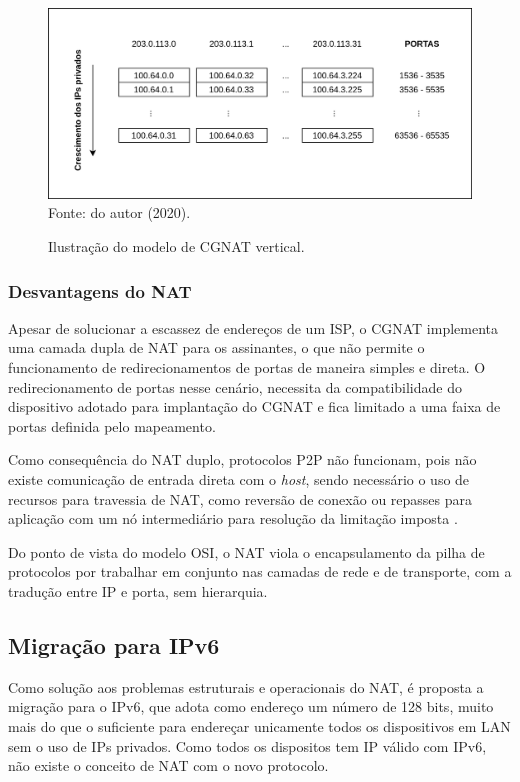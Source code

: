     \begin{figure}[!htb]
        \centering
        \caption{Ilustração do modelo de CGNAT vertical.} 
        \label{fig:cgnat_vertical} 
        \includegraphics[width=0.9\linewidth]{img/CGNAT-Vertical.png} \\
        {\small Fonte: do autor (2020).} 
    \end{figure}

\subsubsection{Desvantagens do NAT}

    Apesar de solucionar a escassez de endereços de um ISP, o CGNAT implementa uma camada dupla de NAT para os assinantes, o que não permite o funcionamento de redirecionamentos de portas de maneira simples e direta. O redirecionamento de portas nesse cenário, necessita da compatibilidade do dispositivo adotado para implantação do CGNAT e fica limitado a uma faixa de portas definida pelo mapeamento.
    
    Como consequência do NAT duplo, protocolos P2P não funcionam, pois não existe comunicação de entrada direta com o \textit{host}, sendo necessário o uso de recursos para travessia de NAT, como reversão de conexão ou repasses para aplicação com um nó intermediário para resolução da limitação imposta \cite{kurose2014}.
    
    Do ponto de vista do modelo OSI, o NAT viola o encapsulamento da pilha de protocolos por trabalhar em conjunto nas camadas de rede e de transporte, com a tradução entre IP e porta, sem hierarquia. 
    
\subsection{Migração para IPv6}
    
    Como solução aos problemas estruturais e operacionais do NAT, é proposta a migração para o IPv6, que adota como endereço um número de 128 bits, muito mais do que o suficiente para endereçar unicamente todos os dispositivos em LAN sem o uso de IPs privados. Como todos os dispositos tem IP válido com IPv6, não existe o conceito de NAT com o novo protocolo.
    
